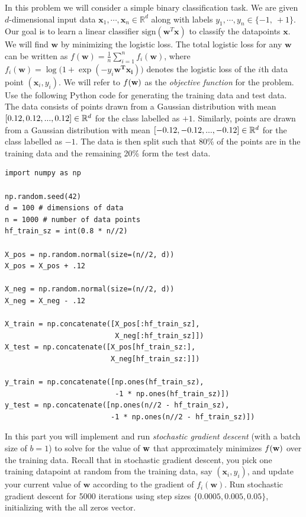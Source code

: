 In this problem we will consider a simple binary classification task. We are given
$d$-dimensional input data
$\textbf{x}_1,\dotsb, \textbf{x}_n \in \mathbb{R}^d$ along with labels $y_1,\dotsb, y_n \in \{-1,\ +1\}$.  Our goal is to learn a linear classifier  $\text{sign}({\mathbf{w}^T}\mathbf{x})$ to classify the datapoints $\mathbf{x}$. We will find $\mathbf{w}$  by minimizing the logistic loss. The total logistic loss for any $\mathbf{w}$  can be
written as
$f(\mathbf{w})=\frac{1}{n}\sum_{i=1}^{n}f_i(\mathbf{w})$, where
$f_i(\mathbf{w})=\log\big(1 + \exp({-y_i \mathbf{w^T x_i}})\big)$ denotes the
logistic loss of the $i$th data point $(\mathbf{x}_i, y_i)$. We will refer to $f(\mathbf{w})$ as the \emph{objective function} for the problem.\\

Use the following Python code for generating the training data and test data. The data consists of points drawn from a Gaussian distribution with mean $[0.12, 0.12, ..., 0.12] \in \mathbb{R}^d$ for the class labelled as $+1$. Similarly, points are drawn from a Gaussian distribution with mean $[-0.12, -0.12, ..., -0.12] \in \mathbb{R}^d$ for the class labelled as $-1$. The data is then split such that 80\% of the points are in the training data and the remaining 20\% form the test data.

\begin{verbatim}
import numpy as np

np.random.seed(42)
d = 100 # dimensions of data
n = 1000 # number of data points
hf_train_sz = int(0.8 * n//2)

X_pos = np.random.normal(size=(n//2, d))
X_pos = X_pos + .12

X_neg = np.random.normal(size=(n//2, d))
X_neg = X_neg - .12

X_train = np.concatenate([X_pos[:hf_train_sz], 
                          X_neg[:hf_train_sz]])
X_test = np.concatenate([X_pos[hf_train_sz:], 
                         X_neg[hf_train_sz:]])

y_train = np.concatenate([np.ones(hf_train_sz), 
                          -1 * np.ones(hf_train_sz)])
y_test = np.concatenate([np.ones(n//2 - hf_train_sz), 
                         -1 * np.ones(n//2 - hf_train_sz)])
\end{verbatim}

In this part you will implement and run \emph{stochastic gradient descent} (with a batch size of $b = 1$) to solve for the value of $\mathbf{w}$ that approximately minimizes $f(\mathbf{w})$ over the training data. Recall that in stochastic gradient descent, you pick one training datapoint at random from the training data, say $(\textbf{x}_i,y_i)$, and update your current value of $\textbf{w}$ according to the gradient of $f_i(\mathbf{w})$. Run stochastic gradient descent for 5000 iterations using step sizes $\{0.0005, 0.005, 0.05\}$, initializing with the all zeros vector.\\

